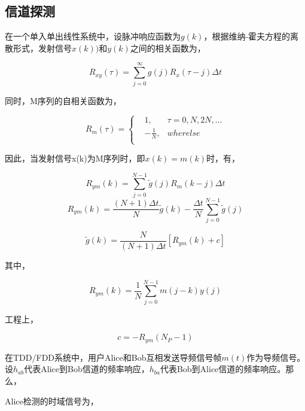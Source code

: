 \documentclass[master]{seuthesis} %
\begin{document}
\begin{Main}
\subsection{信道探测}

在一个单入单出线性系统中，设脉冲响应函数为$g(k)$，根据维纳-霍夫方程的离散形式，发射信号$x(k))$和$y(k)$之间的相关函数为，

\begin{equation}
    R_{xy}(\tau)  = \sum_{j=0}^{\infty} g(j) R_x(\tau-j)\Delta t
\end{equation}

同时，M序列的自相关函数为，

\begin{equation}
    R_m(\tau) = \left\{
  \begin{aligned}
  &1, &\tau = 0, N, 2N, ... \\
  &-\frac{1}{N}, &wherelse \\
  \end{aligned}
  \right.
\end{equation}

因此，当发射信号x(k)为M序列时，即$x(k) = m(k)$时，有，

\begin{equation}
    R_{ym}(k) = \sum_{j=0}^{N-1} \tilde{g}(j)R_m(k-j)\Delta t
\end{equation}
\begin{equation}
    R_{ym}(k) = \frac{(N+1)\Delta t}{N} \tilde{g}(k) - \frac{\Delta t}{N} \sum_{j=0}^{N-1} \tilde{g}(j)
\end{equation}
  
\begin{equation}\label{eq1}
    \tilde{g}(k) = \frac{N}{(N+1)\Delta t} [R_{ym}(k) + c]
\end{equation}

其中，

\begin{equation}
  R_{ym}(k) = \frac{1}{N}\sum_{j=0}^{N-1}m(j-k)y(j)
\end{equation}

工程上，

\begin{equation}
  c=-R_{ym}(N_P - 1)
\end{equation}
  
在TDD/FDD系统中，用户Alice和Bob互相发送导频信号帧$m(t)$作为导频信号。设$h_{ab}$代表Alice到Bob信道的频率响应，$h_{ba}$代表Bob到Alice信道的频率响应。那么，

Alice检测的时域信号为，


\end{Main}
\end{document}
